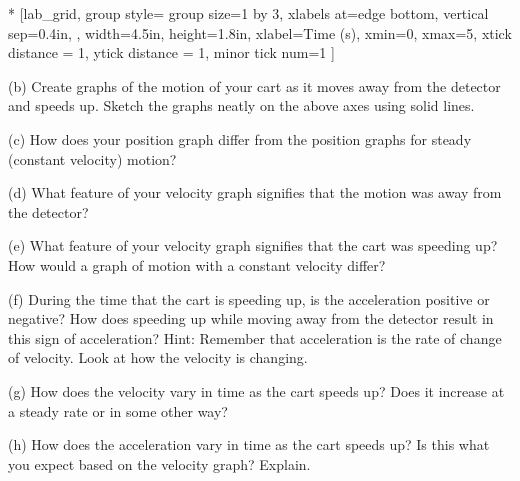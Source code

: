 
\begin{lab_groupplot}*{}
					[lab_grid,
	group style={
		group size=1 by 3,
		xlabels at=edge bottom,
		vertical sep=0.4in,
		},
	width=4.5in,  height=1.8in,
	xlabel=Time (s),
	xmin=0, xmax=5,
	xtick distance = 1, 
	ytick distance = 1, 
	minor tick num=1
	]
\nextgroupplot[
	ymin=0,ymax=2, 
	ylabel={Position (m)},
	ylabel_align={-1},
	]
\nextgroupplot[
	ymin=-1,ymax=1, 
	ylabel={Velocity (m/s)},
	]
\nextgroupplot[
	ymin=-1,ymax=1, 
	ylabel={Acceleration (m/s$^2$)},
	]
\end{lab_groupplot}



(b) Create graphs of the motion of your cart as it moves away from the detector
and speeds up. Sketch the graphs neatly on the above axes using solid lines.

\pagebreak[2]
(c) How does your position graph differ from the position graphs for steady
(constant velocity) motion? 
\vspace{13mm}

(d) What feature of your velocity graph signifies that the motion was away from
the detector? 
\vspace{13mm}

(e) What feature of your velocity graph signifies that the cart was speeding
up? How would a graph of motion with a constant velocity differ? 
\vspace{13mm}

(f) During the time that the cart is speeding up, is the acceleration positive
or negative? How does speeding up while moving away from the detector result
in this sign of acceleration? Hint: Remember that acceleration is the rate of
change of velocity. Look at how the velocity is changing. 
\vspace{13mm}

(g) How does the velocity vary in time as the cart speeds up? Does it increase
at a steady rate or in some other way? 
\vspace{13mm}

(h) How does the acceleration vary in time as the cart speeds up? Is this what
you expect based on the velocity graph? Explain.
\vspace{13mm}

